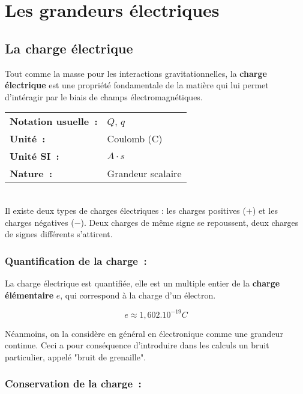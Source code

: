 \chapter{Les grandeurs électriques}

\section{La charge électrique}

Tout comme la masse pour les interactions gravitationnelles, la \textbf{charge électrique} est une propriété fondamentale de la matière qui lui permet d'intéragir par le biais de champs électromagnétiques. \\

\begin{tabular}{ll}
\textbf{Notation usuelle~:} & $Q$, $q$ \\
	\textbf{Unité~:} & Coulomb (C) \\
\textbf{Unité SI~:} & $A \cdot s $ \\
\textbf{Nature~:} & Grandeur scalaire \\
\end{tabular} \\

Il existe deux types de charges électriques : les charges positives ($+$) et les charges négatives ($-$). Deux charges de même signe se repoussent, deux charges de signes différents s'attirent.

\subsection*{ Quantification de la charge~: }

La charge électrique est quantifiée, elle est un multiple entier de la \textbf{charge élémentaire} $e$, qui correspond à la charge d'un électron.

\begin{equation}
	e \approx 1,602.10^{-19} C
\end{equation}

Néanmoins, on la considère en général en électronique comme une grandeur continue. Ceci a pour conséquence d'introduire dans les calculs un bruit particulier, appelé "bruit de grenaille".

\subsection*{ Conservation de la charge~: }

